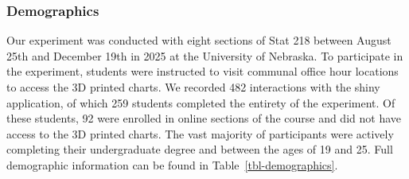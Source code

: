 \documentclass[
  letterpaper,
  DIV=11,
  numbers=noendperiod]{scrartcl}
\begin{document}
\subsubsection{Demographics}\label{demographics}

Our experiment was conducted with eight sections of Stat 218 between
August 25th and December 19th in 2025 at the University of Nebraska. To
participate in the experiment, students were instructed to visit
communal office hour locations to access the 3D printed charts. We
recorded 482 interactions with the shiny application, of which 259
students completed the entirety of the experiment. Of these students, 92
were enrolled in online sections of the course and did not have access
to the 3D printed charts. The vast majority of participants were
actively completing their undergraduate degree and between the ages of
19 and 25. Full demographic information can be found in
Table~\ref{tbl-demographics}.
\end{document}
